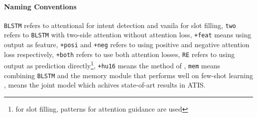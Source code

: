 \paragraph{Naming Conventions}
\texttt{BLSTM} refers to attentional \BLSTM for intent detection and vanila \BLSTM for slot filling, \texttt{two} refers to \texttt{BLSTM} with two-side attention without attention loss, \texttt{+feat} means using \RE output as feature, \texttt{+posi} and \texttt{+neg} refers to using positive and negative attention loss respectively, \texttt{+both} refers to use both attention losses, \texttt{RE} refers to using \RE output as prediction directly\footnote{for slot filling, patterns for attention guidance are used}, \texttt{+hu16} means the method of \cite{liu2016attention}, \texttt{mem} means combining \texttt{BLSTM} and the memory module that performs well on few-shot learning \cite{kaiser2017learning}, \LL means the joint model \cite{liu2016attention} which achives state-of-art results in ATIS. 



